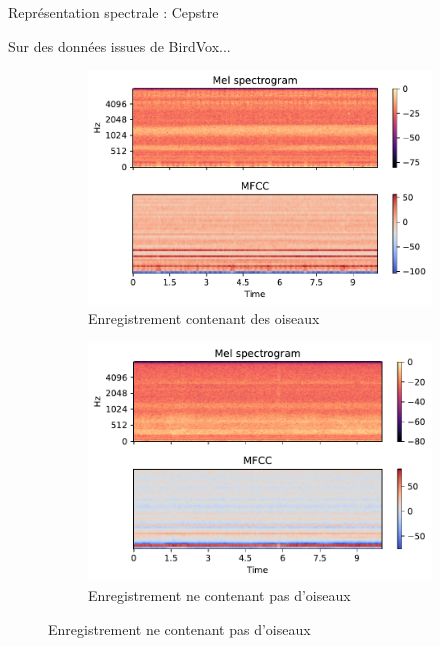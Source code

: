 \documentclass[compress,xcolor=table]{beamer}
\begin{document}
\begin{frame}{Représentation spectrale : Cepstre}

    Sur des données issues de BirdVox...

    \begin{figure}[ht]
        \centering
        \begin{subfigure}[b]{0.45\textwidth}
            \centering
            \includegraphics[width=\textwidth]{../images/audio/birds.mfcc.birdvox.pdf}
            \caption{Enregistrement contenant des oiseaux}
            \label{fig:birds.mfcc.birdvox}
        \end{subfigure}
        \hfill
        \begin{subfigure}[b]{0.45\textwidth}
            \centering
            \includegraphics[width=\textwidth]{../images/audio/nobirds.mfcc.birdvox.pdf}
            \caption{Enregistrement ne contenant pas d'oiseaux}
            \label{fig:nobirds.mfcc.birdvox}
        \end{subfigure}
    \end{figure}

\end{frame}
\end{document}

